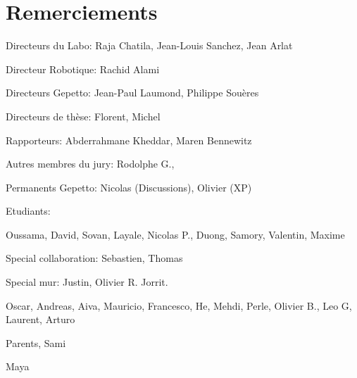 \chapter*{Remerciements}

Directeurs du Labo: Raja Chatila, Jean-Louis Sanchez, Jean Arlat

Directeur Robotique: Rachid Alami

Directeurs Gepetto: Jean-Paul Laumond, Philippe Souères

Directeurs de thèse: Florent, Michel

Rapporteurs: Abderrahmane Kheddar, Maren Bennewitz

Autres membres du jury: Rodolphe G., 

Permanents Gepetto: Nicolas (Discussions), Olivier (XP)

Etudiants:

Oussama, David, Sovan, Layale, Nicolas P., Duong, Samory, Valentin,
Maxime

Special collaboration: Sebastien, Thomas

Special mur: Justin, Olivier R. Jorrit.

Oscar, Andreas, Aiva, Mauricio, Francesco, He, Mehdi, Perle, Olivier
B., Leo G, Laurent, Arturo

Parents, Sami

Maya
